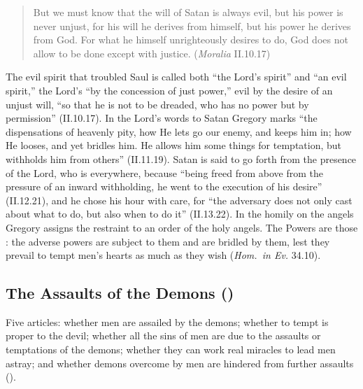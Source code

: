 \begin{quote}
But we must know that the will of Satan is always evil, but his power is
never unjust, for his will he derives from himself, but his power he
derives from God. For what he himself unrighteously desires to do, God does
not allow to be done except with justice. (\emph{Moralia} II.10.17)
\end{quote}

The evil spirit that troubled Saul is called both ``the Lord's spirit'' and
``an evil spirit,'' the Lord's ``by the concession of just power,'' evil by
the desire of an unjust will, ``so that he is not to be dreaded, who has no
power but by permission'' (II.10.17). In the Lord's words to Satan Gregory
marks ``the dispensations of heavenly pity, how He lets go our enemy, and
keeps him in; how He looses, and yet bridles him. He allows him some things
for temptation, but withholds him from others'' (II.11.19). Satan is said to
go forth from the presence of the Lord, who is everywhere, because ``being
freed from above from the pressure of an inward withholding, he went to the
execution of his desire'' (II.12.21), and he chose his hour with care, for
``the adversary does not only cast about what to do, but also when to do
it'' (II.13.22). In the homily on the angels Gregory assigns the restraint to
an order of the holy angels. The Powers are those : the adverse powers are
subject to them and are bridled by them, lest they prevail to tempt men's
hearts as much as they wish (\emph{Hom.\ in Ev.} 34.10).

\sectionguard
\subsection{The Assaults of the Demons ()}\label{sec:q114}

Five articles: whether men are assailed by the demons; whether to tempt is
proper to the devil; whether all the sins of men are due to the assaults
or temptations of the demons; whether they can work real miracles to lead
men astray; and whether demons overcome by men are hindered from further
assaults ().

